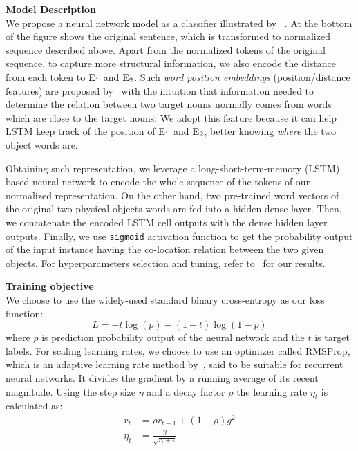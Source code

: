 \noindent \textbf{Model Description}
\\
We propose a neural network model as a classifier illustrated by ~.
At the bottom of the figure shows the original sentence, which is transformed to normalized sequence described above.
Apart from the normalized tokens of the original sequence, to capture more structural information, we also encode the distance from each token to $\textnormal E_1$ and $\textnormal E_2$.
Such \textit{word position embeddings} (position/distance features) are proposed by~\citeauthor{zeng2014relation} with the intuition that information needed to determine the relation between two target nouns normally comes from words which are close to the target nouns. We adopt this feature because it can help LSTM keep track of the position of $\textnormal E_1$ and $\textnormal E_2$, better knowing \textit{where} the two object words are.

Obtaining such representation, we leverage a long-short-term-memory (LSTM) based neural network to encode the whole sequence of the tokens of our normalized representation. On the other hand, two pre-trained word vectors of the original two physical objects words are fed into a hidden dense layer. 
Then, we concatenate the encoded LSTM cell outputs with the dense hidden layer outputs.
Finally, we use \texttt{sigmoid} activation function to get the 
probability output of the input instance having the co-location relation 
between the two given objects. For hyperparameters selection and tuning, refer to~ for our results.

\noindent \textbf{Training objective}\\
We choose to use the widely-used standard binary cross-entropy as our loss function:
\begin{equation*}
	L = -t \log(p) - (1 - t) \log(1 - p)
\end{equation*}
where $p$ is prediction probability output of the neural network and the $t$ is target labels.
For scaling learning rates, we choose to use an optimizer called RMSProp, which is an adaptive learning rate method by~\citeauthor{hinton2012neural}, said to be suitable for recurrent neural networks. It divides the	gradient	by	a	running	average	of	its	recent	magnitude. Using the step size $\eta$ and a decay factor $\rho$ the learning rate $\eta_t$ is calculated as:
\begin{equation*}
	\begin{split}r_t &= \rho r_{t-1} + (1-\rho)g^2\\
	\eta_t &= \frac{\eta}{\sqrt{r_t + \epsilon}}\end{split}
\end{equation*}

